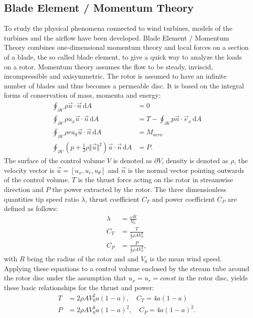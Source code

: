 \subsection{Blade Element / Momentum Theory}
To study the physical phenomena connected to wind turbines, models of the turbines and the airflow have been developed. Blade Element / Momentum Theory combines one-dimensional momentum theory and local forces on a section of a blade, the so called blade element, to give a quick way to analyze the loads on a rotor. Momentum theory assumes the flow to be steady, inviscid, incompressible and axisymmetric. The rotor is assumed to have an infinite number of blades and thus becomes a permeable disc. It is based on the integral forms of conservation of mass, momenta and energy: 
\begin{align}
	\oint_{\partial V} \rho \vec{u} \cdot \vec{n} \, \mathrm{d}A &= 0 \label{eq:mass_cons}\\
	\oint_{\partial V} \rho u_x \vec{u} \cdot \vec{n} \, \mathrm{d}A &= T - \oint_{\partial V} p \vec{n}\cdot \vec{e}_x \, \mathrm{d}A   \label{eq:thrust} \\
	\oint_{\partial V} \rho r u_\theta \vec{u} \cdot \vec{n} \, \mathrm{d}A  &= M_{aero} \label{eq:torque}\\
	\oint_{\partial V} \left(p + \frac{1}{2} \rho \Vert\vec{u} \Vert^2\right) \vec{u} \cdot \vec{n} \, \mathrm{d}A  &= P. \label{eq:power}
\end{align}	The surface of the control volume $V$ is denoted as $\partial V$, density is denoted as $\rho$, the velocity vector is $\vec{u}= \left[u_x, u_r, u_\theta \right]$  and $\vec{n}$ is the normal vector pointing outwards of the control volume. $T$ is the thrust force acting on the rotor in streamwise direction and $P$ the power extracted by the rotor. 
The three dimensionless quantities tip speed ratio $\lambda$, thrust coefficient $C_T$ and power coefficient $C_P$ are defined as follows:
\begin{align}
\lambda &= \frac{\omega R}{V_0} \\
C_T &= \frac{T}{\frac{1}{2} \rho A V_0^2} \\
C_P &= \frac{P}{\frac{1}{2} \rho A V_0^3},
\end{align}
with $R$ being the radius of the rotor and and $V_0$ is the mean wind speed. 
Applying these equations to a control volume enclosed by the stream tube around the rotor disc under the assumption that $u_x = u_r = const$ in the rotor disc, yields these basic relationships for the thrust and power:
\begin{align}
	T &= 2 \rho A V_0^2 a(1-a), \quad C_T = 4a(1-a) \label{eq:thrust2}\\
	P &= 2 \rho A V_0^3 a(1-a)^2, \quad C_P = 4a(1-a)^2 \label{eq:power2}.
\end{align}
